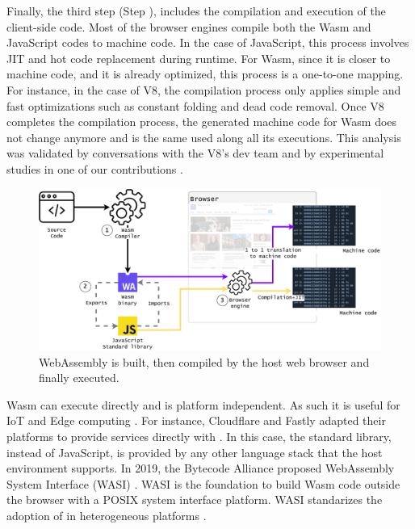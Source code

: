 Finally, the third step (Step ), includes the compilation and execution of the client-side code. Most of the browser engines compile both the Wasm  and JavaScript codes to machine code. In the case of JavaScript, this process involves JIT and hot code replacement during runtime. For Wasm, since it is closer to machine code, and it is already optimized, this process is a one-to-one mapping. For instance, in the case of V8, the compilation process only applies simple and fast optimizations such as constant folding and dead code removal. Once V8 completes the compilation process, the generated machine code for Wasm does not change anymore and is the same used along all its executions. This analysis was validated by conversations with the V8's dev team and by experimental studies in one of our contributions \cite{CROW}.  

\begin{figure}[h]
    \centering
    \includegraphics[width=\linewidth]{diagrams/wasm_workflow.pdf}
    \caption{WebAssembly is built, then compiled by the host web browser and finally executed. }
    \label{diagrams:sota:wasm}
\end{figure}

Wasm can execute directly and is platform independent. As such it is useful for IoT and Edge computing \cite{Narayan2021Swivel,Sledge}. For instance, Cloudflare and Fastly adapted their platforms to provide services directly with \wasm. In this case, the standard library, instead of JavaScript, is provided by any other language stack that the host environment supports.
In 2019, the Bytecode Alliance \cite{bytecodealliance} proposed WebAssembly System Interface (WASI) \cite{WASI}. WASI is the foundation to build Wasm code outside the browser with a POSIX system interface platform. WASI standarizes the adoption of \wasm in heterogeneous platforms \cite{bryant2020webassembly}. 


